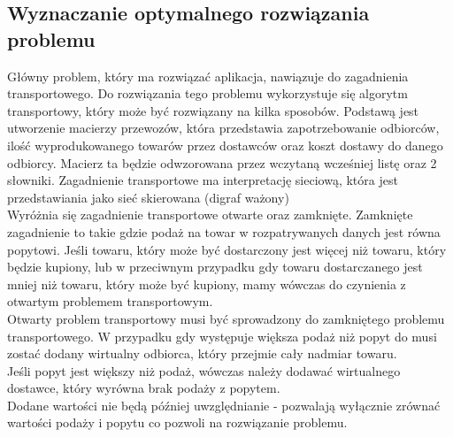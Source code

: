 \documentclass[12pt]{article}
\begin{document}
\subsection{Wyznaczanie optymalnego rozwiązania problemu}
\qquad Główny problem, który ma rozwiązać aplikacja, nawiązuje do zagadnienia transportowego. Do rozwiązania tego problemu wykorzystuje się algorytm transportowy, który może być rozwiązany na kilka sposobów. Podstawą jest utworzenie macierzy przewozów, która przedstawia zapotrzebowanie odbiorców, ilość wyprodukowanego towarów przez dostawców oraz koszt dostawy do danego odbiorcy. Macierz ta będzie odwzorowana przez wczytaną wcześniej listę oraz 2 słowniki. Zagadnienie transportowe ma interpretację sieciową, która jest przedstawiania jako sieć skierowana (digraf ważony) \\
Wyróżnia się zagadnienie transportowe otwarte oraz zamknięte. Zamknięte zagadnienie to takie gdzie podaż na towar w rozpatrywanych danych jest równa popytowi. Jeśli towaru, który może być dostarczony jest więcej niż towaru, który będzie kupiony, lub w przeciwnym przypadku gdy towaru dostarczanego jest mniej niż towaru, który może być kupiony, mamy wówczas do czynienia z otwartym problemem transportowym. \\
Otwarty problem transportowy musi być sprowadzony do zamkniętego problemu transportowego.
W przypadku gdy występuje większa podaż niż popyt do musi zostać dodany wirtualny odbiorca, który przejmie cały nadmiar towaru. \\
Jeśli popyt jest większy niż podaż, wówczas należy dodawać wirtualnego dostawce, który wyrówna brak podaży z popytem. \\
Dodane wartości nie będą później uwzględnianie - pozwalają wyłącznie zrównać wartości podaży i popytu co pozwoli na rozwiązanie problemu. \\
\end{document}

